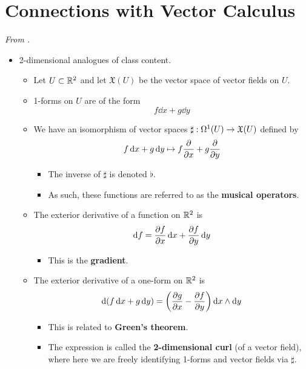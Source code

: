 \documentclass[../notes.tex]{subfiles}
\begin{document}
\section{Connections with Vector Calculus}
\emph{From \textcite{bib:KlugVectorCalc}.}
\begin{itemize}
    \item {}2-dimensional analogues of class content.
    \begin{itemize}
        \item Let $U\subset\R^2$ and let $\mathfrak{X}(U)$ be the vector space of vector fields on $U$.
        \item 1-forms on $U$ are of the form
        \begin{equation*}
            f\dd{x}+g\dd{y}
        \end{equation*}
        \item We have an isomorphism of vector spaces $\sharp:\ome[1]{U}\to\mathfrak{X}(U)$ defined by
        \begin{equation*}
            f\dd{x}+g\dd{y} \mapsto f\pdv{x}+g\pdv{y}
        \end{equation*}
        \begin{itemize}
            \item The inverse of $\sharp$ is denoted $\flat$.
            \item As such, these functions are referred to as the \textbf{musical operators}.
        \end{itemize}
        \item The exterior derivative of a function on $\R^2$ is
        \begin{equation*}
            \dd f = \pdv{f}{x}\dd{x}+\pdv{f}{y}\dd{y}
        \end{equation*}
        \begin{itemize}
            \item This is the \textbf{gradient}.
        \end{itemize}
        \item The exterior derivative of a one-form on $\R^2$ is
        \begin{equation*}
            \dd(f\dd{x}+g\dd{y}) = \left( \pdv{g}{x}-\pdv{f}{y} \right)\dd{x}\wedge\dd{y}
        \end{equation*}
        \begin{itemize}
            \item This is related to \textbf{Green's theorem}.
            \item The expression is called the \textbf{2-dimensional curl} (of a vector field), where here we are freely identifying 1-forms and vector fields via $\sharp$.

\end{itemize}
\end{itemize}
\end{itemize}
\end{document}
